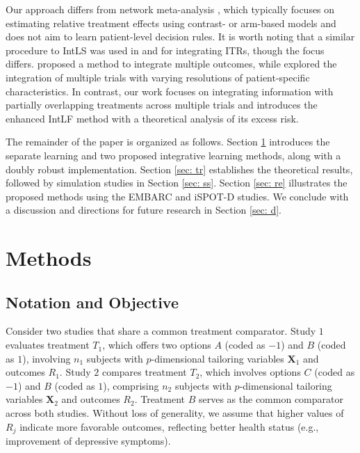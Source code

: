 \documentclass[12pt]{article}
\begin{document}
Our approach differs from network meta-analysis \citep[NMA;][]{lumley2002network}, which typically focuses on estimating relative treatment effects using contrast- or arm-based models and does not aim to learn patient-level decision rules. It is worth noting that a similar procedure to IntLS was used in \cite{gao2024fusing} and \cite{qiu2024integrative} for integrating ITRs, though the focus differs. \cite{gao2024fusing} proposed a method to integrate multiple outcomes, while \cite{qiu2024integrative} explored the integration of multiple trials with varying resolutions of patient-specific characteristics. In contrast, our work focuses on integrating information with partially overlapping treatments across multiple trials and introduces the enhanced IntLF method with a theoretical analysis of its excess risk. 

The remainder of the paper is organized as follows. Section \ref{sec: m} introduces the separate learning and two proposed integrative learning methods, along with a doubly robust implementation. Section \ref{sec: tr} establishes the theoretical results, followed by simulation studies in Section \ref{sec: ss}. Section \ref{sec: re} illustrates the proposed methods using the EMBARC and iSPOT-D studies. We conclude with a discussion and directions for future research in Section \ref{sec: d}.

\section{Methods}\label{sec: m}
\subsection{Notation and Objective}
Consider two studies that share a common treatment comparator. Study $1$ evaluates treatment $T_1$, which offers two options $A$ (coded as $-1$) and $B$ (coded as $1$), involving $n_1$ subjects with $p$-dimensional tailoring variables $\boldsymbol X_1$ and outcomes $R_1$. Study $2$ compares treatment $T_2$, which involves options $C$ (coded as $-1$) and $B$ (coded as $1$), comprising $n_2$ subjects with $p$-dimensional tailoring variables $\boldsymbol X_2$ and outcomes $R_2$. Treatment $B$ serves as the common comparator across both studies. Without loss of generality, we assume that higher values of $R_j$ indicate more favorable outcomes, reflecting better health status (e.g., improvement of depressive symptoms). 
\end{document}
